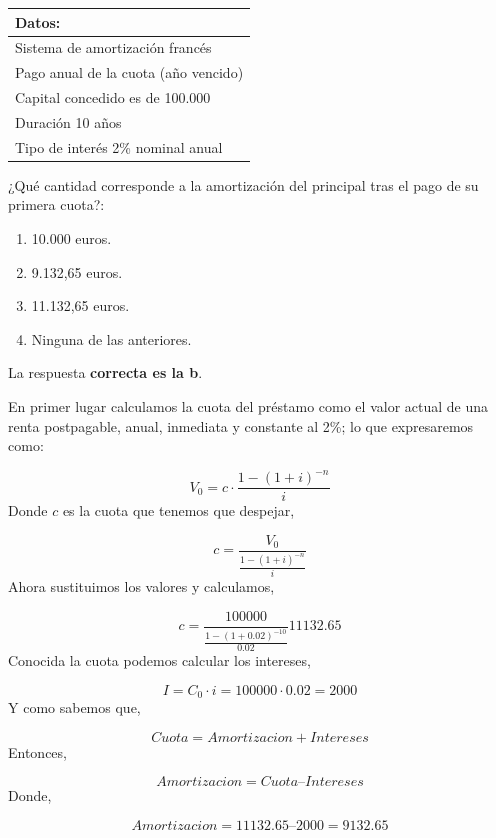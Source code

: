 \documentclass[
  letterpaper,
  DIV=11,
  numbers=noendperiod]{scrreprt}
\begin{document}
\begin{longtable}[]{@{}l@{}}
\toprule()
\textbf{Datos:} \\
\midrule()
\endhead
Sistema de amortización francés \\
Pago anual de la cuota (año vencido) \\
Capital concedido es de 100.000 \\
Duración 10 años \\
Tipo de interés 2\% nominal anual \\
\bottomrule()
\end{longtable}

¿Qué cantidad corresponde a la amortización del principal tras el pago
de su primera cuota?:

\begin{enumerate}
\def\labelenumi{\alph{enumi})}
\item
  10.000 euros.
\item
  9.132,65 euros.
\item
  11.132,65 euros.
\item
  Ninguna de las anteriores.
\end{enumerate}

\begin{tcolorbox}[enhanced jigsaw, left=2mm, opacityback=0, colback=white, breakable, arc=.35mm, bottomrule=.15mm, rightrule=.15mm, toprule=.15mm, leftrule=.75mm, colframe=quarto-callout-tip-color-frame]
\begin{minipage}[t]{5.5mm}
\textcolor{quarto-callout-tip-color}{\faLightbulb}
\end{minipage}%
\begin{minipage}[t]{\textwidth - 5.5mm}

La respuesta \textbf{correcta es la b}.

En primer lugar calculamos la cuota del préstamo como el valor actual de
una renta postpagable, anual, inmediata y constante al 2\%; lo que
expresaremos como:

\[V_0=c\cdot\frac{1-\left(1+i\right)^{-n}}{i}\] Donde \(c\) es la cuota
que tenemos que despejar,

\[c=\frac{V_0 }{ \frac{1-\left(1+i\right)^{-n}}{i}}\] Ahora sustituimos
los valores y calculamos,

\[c=\frac{100000}{ \frac{1-\left(1+0.02\right)^{-10}}{0.02}}11132.65\]
Conocida la cuota podemos calcular los intereses,

\[I=C_0\cdot i=100000\cdot0.02=2000\] Y como sabemos que,

\[Cuota = Amortizacion + Intereses\] Entonces,

\[Amortizacion = Cuota – Intereses\] Donde,

\[Amortizacion = 11132.65 – 2000=9132.65\]

\end{minipage}%
\end{tcolorbox}
\end{document}
